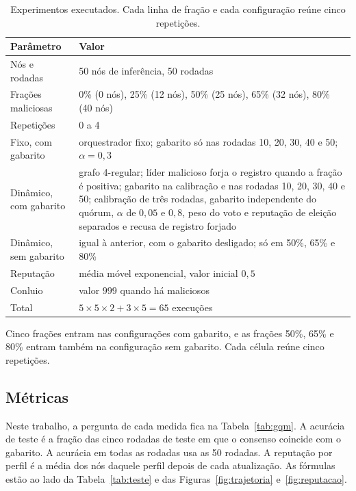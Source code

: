 \documentclass[12pt]{article}
\begin{document}
\begin{table}[htbp]
\centering
\caption{Experimentos executados. Cada linha de fração e cada configuração reúne cinco repetições.}
\label{tab:experimentos}
\footnotesize
\begin{tabular}{|l|p{9.0cm}|}
\hline
\textbf{Parâmetro} & \textbf{Valor} \\
\hline
Nós e rodadas & 50 nós de inferência, 50 rodadas \\
\hline
Frações maliciosas & 0\% (0 nós), 25\% (12 nós), 50\% (25 nós), 65\% (32 nós), 80\% (40 nós) \\
\hline
Repetições & 0 a 4 \\
\hline
Fixo, com gabarito & orquestrador fixo; gabarito só nas rodadas 10, 20, 30, 40 e 50; $\alpha=0{,}3$ \\
\hline
Dinâmico, com gabarito & grafo 4-regular; líder malicioso forja o registro quando a fração é positiva; gabarito na calibração e nas rodadas 10, 20, 30, 40 e 50; calibração de três rodadas, gabarito independente do quórum, $\alpha$ de $0{,}05$ e $0{,}8$, peso do voto e reputação de eleição separados e recusa de registro forjado \\
\hline
Dinâmico, sem gabarito & igual à anterior, com o gabarito desligado; só em 50\%, 65\% e 80\% \\
\hline
Reputação & média móvel exponencial, valor inicial $0{,}5$ \\
\hline
Conluio & valor $999$ quando há maliciosos \\
\hline
Total & $5 \times 5 \times 2 + 3 \times 5 = 65$ execuções \\
\hline
\end{tabular}
\end{table}

Cinco frações entram nas configurações com gabarito, e as frações 50\%, 65\% e 80\% entram também na configuração sem gabarito. Cada célula reúne cinco repetições.

\subsection{Métricas}

Neste trabalho, a pergunta de cada medida fica na Tabela~\ref{tab:gqm}. A acurácia de teste é a fração das cinco rodadas de teste em que o consenso coincide com o gabarito. A acurácia em todas as rodadas usa as 50 rodadas. A reputação por perfil é a média dos nós daquele perfil depois de cada atualização. As fórmulas estão ao lado da Tabela~\ref{tab:teste} e das Figuras~\ref{fig:trajetoria} e~\ref{fig:reputacao}.
\end{document}
